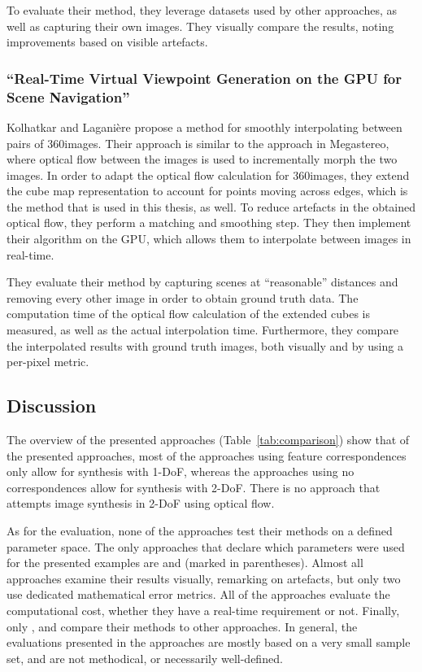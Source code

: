 To evaluate their method, they leverage datasets used by other approaches, as well as capturing their own images. They visually compare the results, noting improvements based on visible artefacts.



\subsubsection{``Real-Time Virtual Viewpoint Generation on the GPU for Scene Navigation'' \cite{360flowblending}}
Kolhatkar and Lagani\`ere \cite{360flowblending} propose a method for smoothly interpolating between pairs of 360\degree images.
Their approach is similar to the approach in Megastereo, where optical flow between the images is used to incrementally morph the two images. In order to adapt the optical flow calculation for 360\degree images, they extend the cube map representation to account for points moving across edges, which is the method that is used in this thesis, as well. To reduce artefacts in the obtained optical flow, they perform a matching and smoothing step. They then implement their algorithm on the GPU, which allows them to interpolate between images in real-time. 

They evaluate their method by capturing scenes at ``reasonable'' distances and removing every other image in order to obtain ground truth data. The computation time of the optical flow calculation of the extended cubes is measured, as well as the actual interpolation time. Furthermore, they compare the interpolated results with ground truth images, both visually and by using a per-pixel metric.

\subsection{Discussion}
The overview of the presented approaches (Table~\ref{tab:comparison}) show that of the presented approaches, most of the approaches using feature correspondences only allow for synthesis with 1-DoF, whereas the approaches using no correspondences allow for synthesis with 2-DoF. There is no approach that attempts image synthesis in 2-DoF using optical flow.

As for the evaluation, none of the approaches test their methods on a defined parameter space. The only approaches that declare which parameters were used for the presented examples are \cite{raytracing} and \cite{cube2video} (marked in parentheses). Almost all approaches examine their results visually, remarking on artefacts, but only two use dedicated mathematical error metrics. All of the approaches evaluate the computational cost, whether they have a real-time requirement or not. Finally, only \cite{megastereo}, \cite{6dof} and \cite{cube2video} compare their methods to other approaches. In general, the evaluations presented in the approaches are mostly based on a very small sample set, and are not methodical, or necessarily well-defined.

